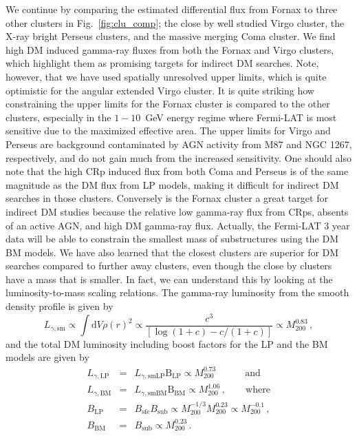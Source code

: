 \documentclass[10pt,aps,pra,reprint,amsmath,amsfonts,amssymb,showpacs]{revtex4-1}
\newcommand{\rmn}{\mathrm}
\newcommand{\sfe}{\rmn{sfe}}
\newcommand{\sub}{\rmn{sub}}
\newcommand{\B}{\rmn{B}}
\newcommand{\dd}{\rmn{d}}
\newcommand{\mvir}{M_{200}}
\begin{document}
We continue by comparing the estimated differential flux from Fornax
to three other clusters in Fig.~\ref{fig:clu_comp}; the close by well
studied Virgo cluster, the X-ray bright Perseus clusters, and the
massive merging Coma cluster. We find high DM induced gamma-ray fluxes
from both the Fornax and Virgo clusters, which highlight them as
promising targets for indirect DM searches. Note, however, that we
have used spatially unresolved upper limits, which is quite optimistic
for the angular extended Virgo cluster. It is quite striking how
constraining the upper limits for the Fornax cluster is compared to
the other clusters, especially in the $1-10$~GeV energy regime where
Fermi-LAT is most sensitive due to the maximized effective area. The
upper limits for Virgo and Perseus are background contaminated by AGN
activity from M87 and NGC 1267, respectively, and do not gain much
from the increased sensitivity. One should also note that the high CRp
induced flux from both Coma and Perseus is of the same magnitude as
the DM flux from LP models, making it difficult for indirect DM
searches in those clusters. Conversely is the Fornax cluster a great
target for indirect DM studies because the relative low gamma-ray flux
from CRps, absents of an active AGN, and high DM gamma-ray
flux. Actually, the Fermi-LAT 3 year data will be able to constrain
the smallest mass of substructures using the DM BM models. We have
also learned that the closest clusters are superior for DM searches
compared to further away clusters, even though the close by clusters
have a mass that is smaller. In fact, we can understand this by
looking at the luminosity-to-mass scaling relations. The gamma-ray
luminosity from the smooth density profile is given by
\begin{equation}
L_{\gamma,\rmn{sm}} \propto \int \dd V \rho(r)^2 \propto \frac{c^3}
{\left[\log\left(1+c\right)-c/(1+c)\right]} \propto \mvir^{0.83}\,,
\end{equation}
and the total DM luminosity including boost factors for the LP and
the BM models are given by
\begin{eqnarray}
L_{\gamma,\rmn{LP}} &=& L_{\gamma,\rmn{smLP}} \B_\rmn{LP} \propto \mvir^{0.73}\qquad
\,\,\,\,\,\,\rmn{and}\\
L_{\gamma,\rmn{BM}} &=& L_{\gamma,\rmn{smBM}} \B_\rmn{BM} \propto  \mvir^{1.06}\,,\qquad
\rmn{where} \\
B_\rmn{LP}&=&B_\sfe B_\sub \propto \mvir^{-1/3}\mvir^{0.23} \propto
 \mvir^{-0.1}\,,\\
B_\rmn{BM}&=&B_\sub \propto \mvir^{0.23}\,.
\end{eqnarray}
\end{document}
